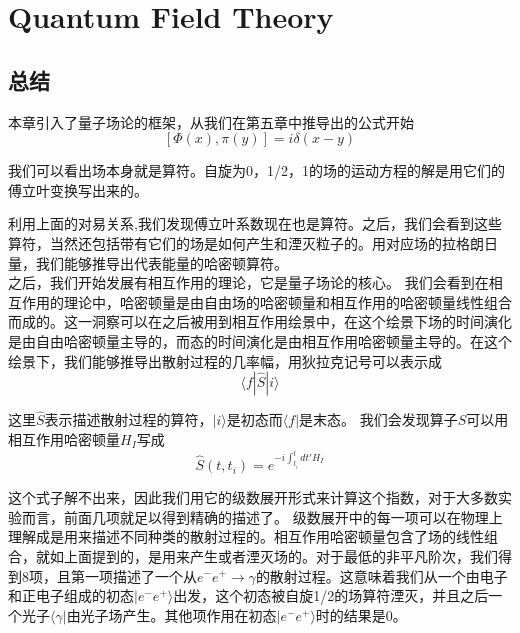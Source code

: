 




\chapter[量子场论]{Quantum Field Theory}
\label{chap9}

\section*{总结}
本章引入了量子场论的框架，从我们在第五章中推导出的公式开始
$$[\Phi(x),\pi(y)]=i\delta(x-y)$$

我们可以看出场本身就是算符。自旋为0，1/2，1的场的运动方程的解是用它们的傅立叶变换写出来的。

利用上面的对易关系,我们发现傅立叶系数现在也是算符。之后，我们会看到这些算符，当然还包括带有它们的场是如何产生和湮灭粒子的。用对应场的拉格朗日量，我们能够推导出代表能量的哈密顿算符。\\
之后，我们开始发展有相互作用的理论，它是量子场论的核心。 我们会看到在相互作用的理论中，哈密顿量是由自由场的哈密顿量和相互作用的哈密顿量线性组合而成的。这一洞察可以在之后被用到相互作用绘景中，在这个绘景下场的时间演化是由自由哈密顿量主导的，而态的时间演化是由相互作用哈密顿量主导的。在这个绘景下，我们能够推导出散射过程的几率幅，用狄拉克记号可以表示成
$$\langle f | \hat{S} | i\rangle$$

这里$\hat{S}$表示描述散射过程的算符，$|i\rangle$是初态而$\langle f|$是末态。 我们会发现算子$\hat{S}$可以用相互作用哈密顿量$H_{I}$写成
$$\hat{S}(t,t_{i})=e^{-i\int_{t_{i}}^{t} dt' H_{I}}$$

这个式子解不出来，因此我们用它的级数展开形式来计算这个指数，对于大多数实验而言，前面几项就足以得到精确的描述了。
级数展开中的每一项可以在物理上理解成是用来描述不同种类的散射过程的。相互作用哈密顿量包含了场的线性组合，就如上面提到的，是用来产生或者湮灭场的。对于最低的非平凡阶次，我们得到8项，且第一项描述了一个从$e^{-} e^{+} \to \gamma$的散射过程。这意味着我们从一个由电子和正电子组成的初态$|e^{-}e^{+} \rangle$出发，这个初态被自旋1/2的场算符湮灭，并且之后一个光子$\langle \gamma |$由光子场产生。其他项作用在初态$|e^{-}e^{+} \rangle$时的结果是0。\\

